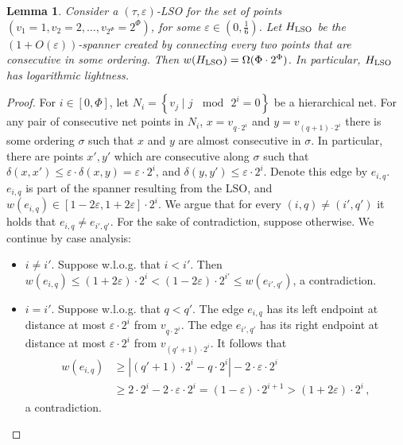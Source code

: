 \documentclass[11pt]{article}
\def\aftermath{\par\vspace{-\belowdisplayskip}\vspace{-\baselineskip}}
\newtheorem{lemma}[theorem]{Lemma}
\def\eps{\varepsilon}
\begin{document}
\begin{lemma}\label{lem:LSO}
Consider a $(\tau,\eps)$-LSO for the set of points $\left(v_1=1,v_2=2,\dots,v_{2^\Phi}=2^\Phi\right)$, 
for some $\eps\in(0,\frac{1}{6})$. Let $H_{{\rm LSO}}$ be the $(1+O(\eps))$-spanner
created by connecting every two points that are consecutive in some
ordering. Then $w(H_{{\rm LSO}})=\Omega(\Phi\cdot2^{\Phi})$. In particular,
$H_{{\rm LSO}}$ has logarithmic lightness.
\end{lemma}
\begin{proof}
For $i\in[0,\Phi]$, let $N_{i}=\left\{ v_{j}\mid j\,\mod\,2^{i}=0\right\} $
be a hierarchical net. For any pair of consecutive net points in $N_{i}$,
$x=v_{q\cdot2^{i}}$ and $y=v_{(q+1)\cdot2^{i}}$ there is some ordering
$\sigma$ such that $x$ and $y$ are almost consecutive in $\sigma$.
In particular, there are points $x',y'$ which are consecutive along
$\sigma$ such that $\delta(x,x')\le\eps\cdot\delta(x,y)=\eps\cdot2^{i}$,
and $\delta(y,y')\le\eps\cdot2^{i}$. Denote this edge by $e_{i,q}$.
$e_{i,q}$ is part of the spanner resulting from the LSO, and $w(e_{i,q})\in\left[1-2\eps,1+2\eps\right]\cdot2^{i}$. 
%
We argue that for every $(i,q)\ne(i',q')$ it holds that $e_{i,q}\ne e_{i',q'}$.
For the sake of contradiction, suppose otherwise. We continue by case
analysis:
\begin{itemize}
\item $i\ne i'$. Suppose w.l.o.g. that $i<i'$. Then $w(e_{i,q})\le(1+2\eps)\cdot2^{i}<(1-2\eps)\cdot2^{i'}\le w(e_{i',q'})$,
a contradiction.
\item $i=i'$. Suppose w.l.o.g. that $q<q'$. The edge $e_{i,q}$ has its
left endpoint at distance at most $\eps\cdot2^{i}$ from $v_{q\cdot2^{i}}$.
The edge $e_{i',q'}$ has its right endpoint at distance at most $\eps\cdot2^{i}$
from $v_{(q'+1)\cdot2^{i}}$. It follows that 
\begin{align*}
w(e_{i,q}) & \ge\left|(q'+1)\cdot2^{i}-q\cdot2^{i}\right|-2\cdot\eps\cdot2^{i}\\
 & \ge2\cdot2^{i}-2\cdot\eps\cdot2^{i}=(1-\eps)\cdot2^{i+1}>(1+2\eps)\cdot2^{i}\,,
\end{align*}
a contradiction.\aftermath
\end{itemize}
\end{proof}
%
\end{document}
